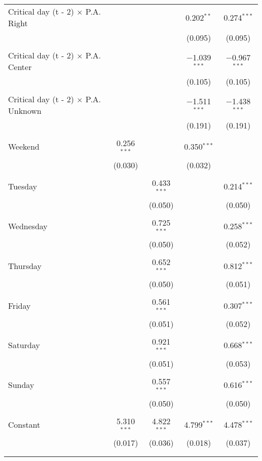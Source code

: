 \documentclass[
]{article}
\begin{document}
\begin{table}[!htbp]
{\begin{tabular}{@{\extracolsep{5pt}}lcccc}
 Critical day (t - 2) $\times$ P.A. Right &  &  & 0.202$^{**}$ & 0.274$^{***}$ \\ 
  &  &  & (0.095) & (0.095) \\ 
  & & & & \\ 
 Critical day (t - 2) $\times$ P.A. Center &  &  & $-$1.039$^{***}$ & $-$0.967$^{***}$ \\ 
  &  &  & (0.105) & (0.105) \\ 
  & & & & \\ 
 Critical day (t - 2) $\times$ P.A. Unknown &  &  & $-$1.511$^{***}$ & $-$1.438$^{***}$ \\ 
  &  &  & (0.191) & (0.191) \\ 
  & & & & \\ 
 Weekend & 0.256$^{***}$ &  & 0.350$^{***}$ &  \\ 
  & (0.030) &  & (0.032) &  \\ 
  & & & & \\ 
 Tuesday &  & 0.433$^{***}$ &  & 0.214$^{***}$ \\ 
  &  & (0.050) &  & (0.050) \\ 
  & & & & \\ 
 Wednesday &  & 0.725$^{***}$ &  & 0.258$^{***}$ \\ 
  &  & (0.050) &  & (0.052) \\ 
  & & & & \\ 
 Thursday &  & 0.652$^{***}$ &  & 0.812$^{***}$ \\ 
  &  & (0.050) &  & (0.051) \\ 
  & & & & \\ 
 Friday &  & 0.561$^{***}$ &  & 0.307$^{***}$ \\ 
  &  & (0.051) &  & (0.052) \\ 
  & & & & \\ 
 Saturday &  & 0.921$^{***}$ &  & 0.668$^{***}$ \\ 
  &  & (0.051) &  & (0.053) \\ 
  & & & & \\ 
 Sunday &  & 0.557$^{***}$ &  & 0.616$^{***}$ \\ 
  &  & (0.050) &  & (0.050) \\ 
  & & & & \\ 
 Constant & 5.310$^{***}$ & 4.822$^{***}$ & 4.799$^{***}$ & 4.478$^{***}$ \\ 
  & (0.017) & (0.036) & (0.018) & (0.037) \\ 
  & & & & \\ 
\hline \\[-1.8ex] 

\end{tabular}}
\end{table}
\end{document}
